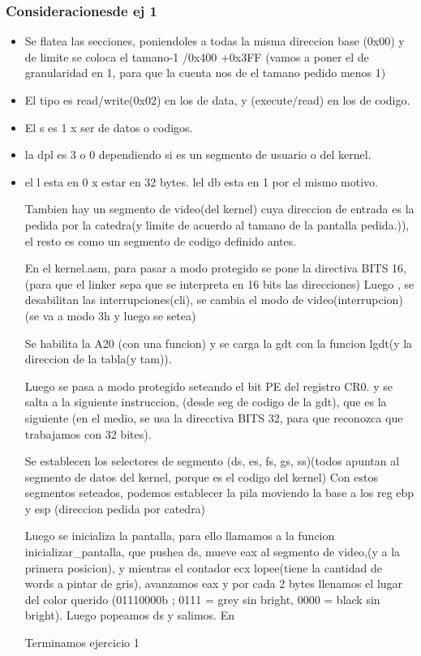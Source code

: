 \documentclass[a4paper]{article}
\begin{document}
\subsubsection{Consideracionesde ej 1}
\begin{itemize}


\item Se flatea las secciones, poniendoles a todas la misma direccion base (0x00) y de limite se coloca el tamano-1 /0x400 +0x3FF
(vamos a poner el de granularidad en 1, para que la cuenta nos de el tamano pedido menos 1)

\item El tipo es read/write(0x02) en los de data, y (execute/read) en los de codigo. 

\item El s es 1 x ser de datos o codigos.

\item la dpl es 3 o 0 dependiendo si es un segmento de usuario o del kernel.

\item el l esta en 0 x estar en 32 bytes. lel db esta en 1 por el mismo motivo. 


Tambien hay un segmento de video(del kernel) cuya direccion de entrada es la pedida por la catedra(y limite de acuerdo al tamano de la pantalla pedida.)), el resto es como un segmento de codigo definido antes.



En el kernel.asm, para pasar a modo protegido se pone la directiva BITS 16, (para que el linker sepa que se interpreta en 16 bits las direcciones)
Luego , se desabilitan las interrupciones(cli), se cambia el modo de video(interrupcion)(se va a modo 3h y luego   se setea) 

Se habilita la A20 (con una funcion) y se carga la gdt con la funcion lgdt(y la direccion de la tabla(y tam)).

Luego se pasa a modo protegido seteando el bit PE del registro CR0. y se salta a la siguiente instruccion, (desde seg de codigo de la gdt), que es la siguiente (en el medio, se usa la direcctiva BITS 32, para que reconozca que trabajamos con 32 bites).

Se establecen los selectores de segmento (ds, es, fs, gs, ss)(todos apuntan al segmento de datos del kernel, porque es el codigo del kernel)
Con estos segmentos seteados, podemos establecer la pila moviendo la base a los reg ebp y esp (direccion pedida por catedra)

 Luego se inicializa la pantalla, para ello llamamos a la funcion inicializar_pantalla, que pushea ds, mueve eax al segmento de video,(y a la primera posicion), y mientras el contador ecx lopee(tiene la cantidad de words a pintar de gris), avanzamos eax y por cada 2 bytes llenamos el lugar del color querido (01110000b ; 0111 = grey sin bright, 0000 = black sin bright). Luego popeamos ds y salimos.
 En 
 
   
Terminamos ejercicio 1
\end{itemize}
\newpage
\end{document}
